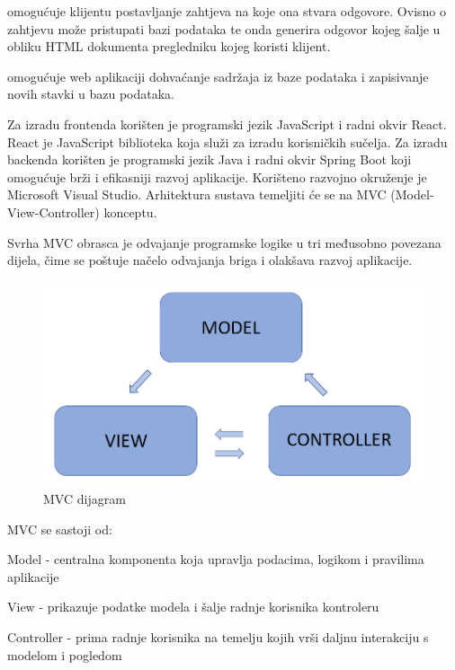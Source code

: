 		\textit {} \text omogućuje klijentu postavljanje zahtjeva na koje ona stvara odgovore. Ovisno o zahtjevu može pristupati bazi podataka te onda generira odgovor kojeg šalje u obliku HTML dokumenta pregledniku kojeg koristi klijent.
		
		\textit {} \text omogućuje web aplikaciji  dohvaćanje sadržaja iz baze podataka i zapisivanje novih stavki u bazu podataka.
		
		\text Za izradu frontenda korišten je programski jezik JavaScript i radni okvir React. React je JavaScript biblioteka koja služi za izradu korisničkih sučelja. Za izradu backenda korišten je programski jezik Java i radni okvir Spring Boot koji omogućuje brži i efikasniji razvoj aplikacije. Korišteno razvojno okruženje je Microsoft Visual Studio. Arhitektura sustava temeljiti će se na MVC (Model-View-Controller) konceptu.
		
		Svrha MVC obrasca je odvajanje programske logike u tri međusobno povezana dijela, čime se poštuje načelo odvajanja briga i olakšava razvoj aplikacije.
		
		\begin{figure}[H]
			\includegraphics[scale=0.50]{slike/mvc.png} %
			\centering
			\caption{MVC dijagram}
			\label{fig:mvc model}
		\end{figure}
	
		\text MVC se sastoji od:
		\begin{packed_item}
			
			\item Model - centralna komponenta koja upravlja podacima, logikom i pravilima aplikacije
			\item View - prikazuje podatke modela i šalje radnje korisnika kontroleru
			\item Controller - prima radnje korisnika na temelju kojih vrši daljnu interakciju s modelom i pogledom
			
		\end{packed_item}

